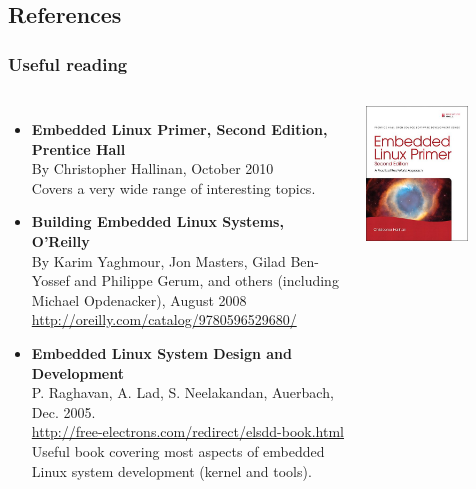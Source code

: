 \subsection{References}

\begin{frame}
  \frametitle{Useful reading}
  \begin{columns}
    \begin{itemize}
    \item {\bf Embedded Linux Primer, Second Edition, Prentice Hall}\\
      \scriptsize
      By Christopher Hallinan, October 2010\\
      Covers a very wide range of interesting topics.
      \normalsize
    \item {\bf Building Embedded Linux Systems, O'Reilly}\\
      \scriptsize
      By Karim Yaghmour, Jon Masters, Gilad Ben-Yossef and Philippe
      Gerum, and others
      (including Michael Opdenacker), August 2008\\
      \url{http://oreilly.com/catalog/9780596529680/}
      \normalsize
    \item {\bf Embedded Linux System Design and Development}\\
      \scriptsize
      P. Raghavan, A. Lad, S. Neelakandan, Auerbach, Dec. 2005.\\
      \url{http://free-electrons.com/redirect/elsdd-book.html}\\
      Useful book covering most aspects of embedded Linux system
      development (kernel and tools).
      \normalsize
    \end{itemize}
    \includegraphics[width=0.7\textwidth]{slides/sysdev-embedded-linux/book-embedded-linux-primer2.jpg}\\

\end{columns}
\end{frame}
